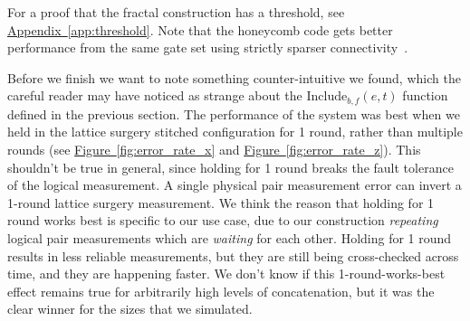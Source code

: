 \documentclass[onecolumn,unpublished,a4paper]{quantumarticle}
\theoremstyle{definition}
\theoremstyle{definition}
\theoremstyle{definition}
\DeclareRobustCommand{\app}[1]{\hyperref[app:#1]{Appendix~\ref*{app:#1}}}
\newcommand{\fig}[1]{\hyperref[fig:#1]{Figure~\ref*{fig:#1}}}
\begin{document}
For a proof that the fractal construction has a threshold, see \app{threshold}.
Note that the honeycomb code gets better performance from the same gate set using strictly sparser connectivity~\cite{hastings2021dynamically,paetznick2023honeycomb,gidney2022honeycombplanar,kesselring2022anyoncondense}.

Before we finish we want to note something counter-intuitive we found, which the careful reader may have noticed as strange about the $\text{Include}_{b,f}(e, t)$ function defined in the previous section.
The performance of the system was best when we held in the lattice surgery stitched configuration for 1 round, rather than multiple rounds (see \fig{error_rate_x} and \fig{error_rate_z}).
This shouldn't be true in general, since holding for 1 round breaks the fault tolerance of the logical measurement.
A single physical pair measurement error can invert a 1-round lattice surgery measurement.
We think the reason that holding for 1 round works best is specific to our use case, due to our construction \emph{repeating} logical pair measurements which are \emph{waiting} for each other.
Holding for 1 round results in less reliable measurements, but they are still being cross-checked across time, and they are happening faster.
We don't know if this 1-round-works-best effect remains true for arbitrarily high levels of concatenation, but it was the clear winner for the sizes that we simulated.
\end{document}
